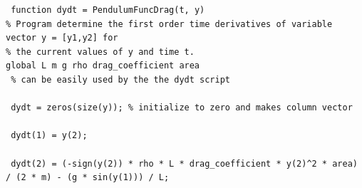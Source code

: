 \documentclass{article}
\begin{document}
 \begin{verbatim}
 function dydt = PendulumFuncDrag(t, y)
% Program determine the first order time derivatives of variable vector y = [y1,y2] for
% the current values of y and time t.
global L m g rho drag_coefficient area
 % can be easily used by the the dydt script

 dydt = zeros(size(y)); % initialize to zero and makes column vector

 dydt(1) = y(2);

 dydt(2) = (-sign(y(2)) * rho * L * drag_coefficient * y(2)^2 * area) / (2 * m) - (g * sin(y(1))) / L;
\end{verbatim}
\end{document}
